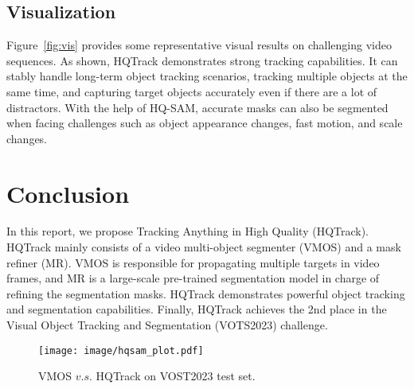 \documentclass[10pt,twocolumn,letterpaper]{article}
\begin{document}
\subsection{Visualization}
Figure~\ref{fig:vis} provides some representative visual results on challenging video sequences. 
As shown, HQTrack demonstrates strong tracking capabilities.
It can stably handle long-term object tracking scenarios, tracking multiple objects at the same time, and capturing target objects accurately even if there are a lot of distractors. 
With the help of HQ-SAM, accurate masks can also be segmented when facing challenges such as object appearance changes, fast motion, and scale changes.






 \section{Conclusion}


In this report, we propose Tracking Anything in High Quality (HQTrack).
HQTrack mainly consists of a video multi-object segmenter (VMOS) and a mask refiner (MR).
VMOS is responsible for propagating multiple targets in video frames, and MR is a large-scale pre-trained segmentation model in charge of refining the segmentation masks.
HQTrack demonstrates powerful object tracking and segmentation capabilities.
Finally, HQTrack achieves the 2nd place in the Visual Object Tracking and Segmentation (VOTS2023) challenge.


\begin{figure}[!t]
	\vspace{-2mm}
	\centering
	\texttt{[image: image/hqsam\_plot.pdf]}
	\vspace{-1.5mm}
	\caption{VMOS $v.s.$ HQTrack on VOST2023 test set. }
	\label{fig:hqsam_plot}
	\vspace{-2mm}
\end{figure}
 


{\small


}
\end{document}
